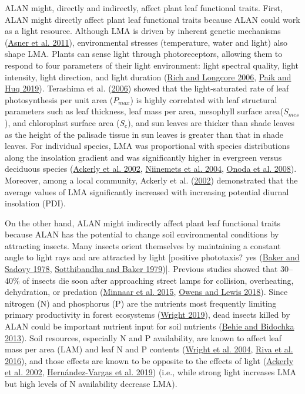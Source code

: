 \documentclass[
  12pt,
  letterpaper,
  DIV=11,
  numbers=noendperiod]{scrartcl}
\begin{document}
ALAN might, directly and indirectly, affect plant leaf functional
traits. First, ALAN might directly affect plant leaf functional traits
because ALAN could work as a light resource. Although LMA is driven by
inherent genetic mechanisms (\protect\hyperlink{ref-Asner2011}{Asner et
al. 2011}), environmental stresses (temperature, water and light) also
shape LMA. Plants can sense light through photoreceptors, allowing them
to respond to four parameters of their light environment: light spectral
quality, light intensity, light direction, and light duration
(\protect\hyperlink{ref-Rich2006}{Rich and Longcore 2006},
\protect\hyperlink{ref-Paik2019}{Paik and Huq 2019}). Terashima et al.
(\protect\hyperlink{ref-Terashima2006}{2006}) showed that the
light-saturated rate of leaf photosynthesis per unit area (\(P_{max}\))
is highly correlated with leaf structural parameters such as leaf
thickness, leaf mass per area, mesophyll surface area(\(S_{mes}\)), and
chloroplast surface area (\(S_c\)), and sun leaves are thicker than
shade leaves as the height of the palisade tissue in sun leaves is
greater than that in shade leaves. For individual species, LMA was
proportional with species distributions along the insolation gradient
and was significantly higher in evergreen versus deciduous species
(\protect\hyperlink{ref-Ackerly2002}{Ackerly et al. 2002},
\protect\hyperlink{ref-Niinemets2004}{Niinemets et al. 2004},
\protect\hyperlink{ref-Onoda2008}{Onoda et al. 2008}). Moreover, among a
local community, Ackerly et al.
(\protect\hyperlink{ref-Ackerly2002}{2002}) demonstrated that the
average values of LMA significantly increased with increasing potential
diurnal insolation (PDI).

On the other hand, ALAN might indirectly affect plant leaf functional
traits because ALAN has the potential to change soil environmental
conditions by attracting insects. Many insects orient themselves by
maintaining a constant angle to light rays and are attracted by light
{[}positive phototaxis? yes (\protect\hyperlink{ref-Baker1978}{Baker and
Sadovy 1978}, \protect\hyperlink{ref-Sotthibandhu1979}{Sotthibandhu and
Baker 1979}){]}. Previous studies showed that 30--40\% of insects die
soon after approaching street lamps for collision, overheating,
dehydration, or predation (\protect\hyperlink{ref-Minnaar2015}{Minnaar
et al. 2015}, \protect\hyperlink{ref-Owens2018}{Owens and Lewis 2018}).
Since nitrogen (N) and phosphorus (P) are the nutrients most frequently
limiting primary productivity in forest ecosystems
(\protect\hyperlink{ref-Wright2019}{Wright 2019}), dead insects killed
by ALAN could be important nutrient input for soil nutrients
(\protect\hyperlink{ref-Behie2013}{Behie and Bidochka 2013}). Soil
resources, especially N and P availability, are known to affect leaf
mass per area (LAM) and leaf N and P contents
(\protect\hyperlink{ref-Wright2004}{Wright et al. 2004},
\protect\hyperlink{ref-Riva2016}{Riva et al. 2016}), and those effects
are known to be opposite to the effects of light
(\protect\hyperlink{ref-Ackerly2002}{Ackerly et al. 2002},
\protect\hyperlink{ref-Hernandez-Vargas2019}{Hernández-Vargas et al.
2019}) (i.e., while strong light increases LMA but high levels of N
availability decrease LMA).
\end{document}

